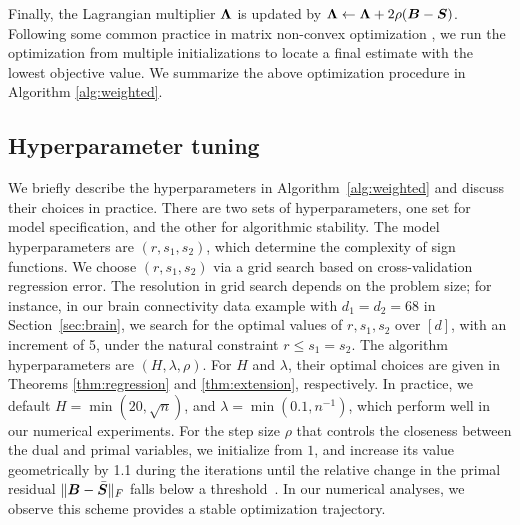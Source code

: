 \documentclass[aos]{imsart}
\theoremstyle{definition}
\begin{document}
Finally, the Lagrangian multiplier $\bm{\Lambda}$ is updated by $\bm{\Lambda}\leftarrow\bm{\Lambda}+2\rho(\bm B-\bm S)$. Following some common practice in matrix non-convex optimization \citep{Ma2016}, we run the optimization from multiple initializations to locate a final estimate with the lowest objective value. We summarize the above optimization procedure in Algorithm \ref{alg:weighted}. 



\subsection{Hyperparameter tuning}

We briefly describe the hyperparameters in Algorithm~\ref{alg:weighted} and discuss their choices in practice. There are two sets of hyperparameters, one set for model specification, and the other for algorithmic stability. The model hyperparameters are $(r,s_1,s_2)$, which determine the complexity of sign functions. We choose $(r,s_1,s_2)$ via a grid search based on cross-validation regression error. The resolution in grid search depends on the problem size; for instance, in our brain connectivity data example with $d_1=d_2=68$ in Section~\ref{sec:brain}, we search for the optimal values of $r, s_1,s_2$ over $[d]$, with an increment of 5, under the natural constraint $r\leq s_1=s_2$. The algorithm hyperparameters are $(H, \lambda, \rho)$. For $H$ and $\lambda$, their optimal choices are given in Theorems \ref{thm:regression} and \ref{thm:extension}, respectively. In practice, we default $H=\min(20, \sqrt{n})$, and $\lambda=\min(0.1,n^{-1})$, which perform well in our numerical experiments. For the step size $\rho$ that controls the closeness between the dual and primal variables, we initialize from $1$, and increase its value geometrically by 1.1 during the iterations until the relative change in the primal residual $\lVert\bm B-\bar {\bm S}\rVert_F$ falls below a threshold~\cite{parikh2014proximal}. In our numerical analyses, we observe this scheme provides a stable optimization trajectory. 
\end{document}
